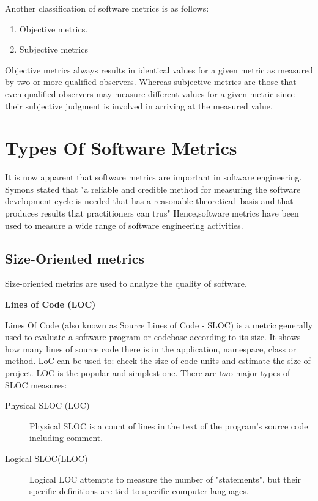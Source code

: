 Another classification of software metrics is as follows:

\begin{enumerate}
	\item Objective metrics.
	\item Subjective metrics
\end{enumerate}

Objective metrics always results in identical values for a given metric as measured by two or more qualified observers. Whereas subjective metrics are those that even qualified observers may measure different values for a given metric since their subjective judgment is involved in arriving at the measured value.

\section{Types Of Software Metrics}

It is now apparent that software metrics are important in software
engineering. Symons stated that "a reliable and credible method
for measuring the software development cycle is needed that has a reasonable
theoretica1 basis and that produces results that practitioners can trus" Hence,software metrics have been used to measure a wide range of software
engineering activities.

\subsection{Size-Oriented metrics}

Size-oriented metrics are used to analyze the quality of software.

\textbf{Lines of Code (LOC)}

Lines Of Code (also known as Source Lines of Code - SLOC) is a metric generally used to
evaluate a software program or codebase according to its size. It shows how many lines of source
code there is in the application, namespace, class or method. LoC can be used to: check the size
of code units and estimate the size of project. LOC is the popular and simplest one.
There are two major types of SLOC measures: 

\begin{description}
	\item[Physical SLOC (LOC)] Physical SLOC is a count of lines in the text of the program's source code including comment.
	\item[Logical SLOC(LLOC)] Logical LOC attempts to measure the number of "statements", but their specific definitions are tied to specific computer languages.
\end{description}

